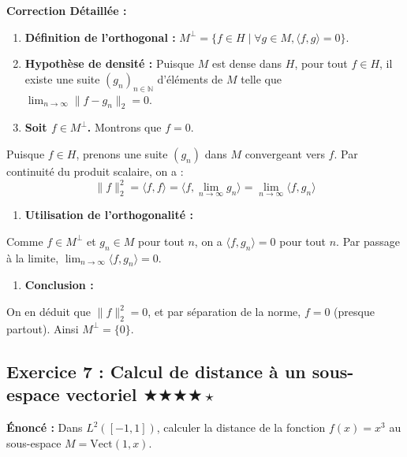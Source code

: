 \documentclass[11pt,a4paper]{article}
\begin{document}
\textbf{Correction Détaillée :}
\begin{enumerate}
\item \textbf{Définition de l'orthogonal :} $M^\perp = \{ f \in H \mid \forall g \in M, \langle f, g \rangle = 0 \}$.

\item \textbf{Hypothèse de densité :} Puisque $M$ est dense dans $H$, pour tout $f \in H$, il existe une suite $(g_n)_{n \in \mathbb{N}}$ d'éléments de $M$ telle que $\lim_{n \to \infty} \|f - g_n\|_2 = 0$.

\item \textbf{Soit $f \in M^\perp$.} Montrons que $f = 0$.
\end{enumerate}
   Puisque $f \in H$, prenons une suite $(g_n)$ dans $M$ convergeant vers $f$.
   Par continuité du produit scalaire, on a :
   $$ \|f\|_2^2 = \langle f, f \rangle = \langle f, \lim_{n \to \infty} g_n \rangle = \lim_{n \to \infty} \langle f, g_n \rangle $$
\begin{enumerate}
\item \textbf{Utilisation de l'orthogonalité :}
\end{enumerate}
   Comme $f \in M^\perp$ et $g_n \in M$ pour tout $n$, on a $\langle f, g_n \rangle = 0$ pour tout $n$.
   Par passage à la limite, $\lim_{n \to \infty} \langle f, g_n \rangle = 0$.
\begin{enumerate}
\item \textbf{Conclusion :}
\end{enumerate}
   On en déduit que $\|f\|_2^2 = 0$, et par séparation de la norme, $f = 0$ (presque partout). Ainsi $M^\perp = \{0\}$.



\subsection*{Exercice 7 : Calcul de distance à un sous-espace vectoriel \quad $\bigstar\bigstar\bigstar\bigstar\star$}

\textbf{Énoncé :}
Dans $L^2([-1,1])$, calculer la distance de la fonction $f(x) = x^3$ au sous-espace $M = \text{Vect}(1, x)$.
\end{document}

